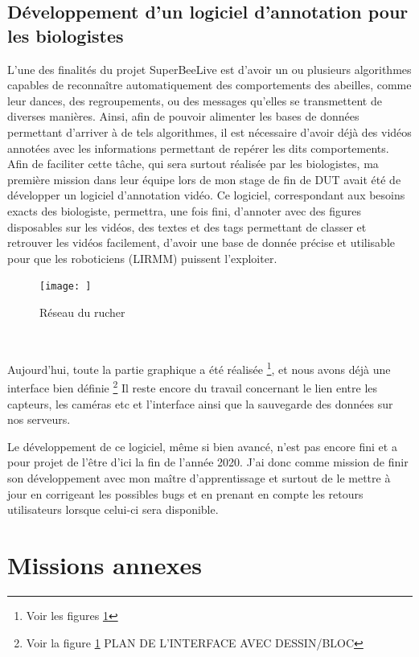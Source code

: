 \documentclass[11pt,french,a4paper]{report}
\begin{document}
{\subsection{Développement d'un logiciel d'annotation pour les biologistes}
L'une des finalités du projet SuperBeeLive est d'avoir un ou plusieurs algorithmes capables de reconnaître automatiquement 
des comportements des abeilles, comme leur dances, des regroupements, ou des messages qu'elles se transmettent de diverses manières.
Ainsi, afin de pouvoir alimenter les bases de données permettant d'arriver à de tels algorithmes, il est nécessaire d'avoir 
déjà des vidéos annotées avec les informations permettant de repérer les dits comportements. 
Afin de faciliter cette tâche, qui sera surtout réalisée par les biologistes, ma première mission dans leur équipe lors de mon 
stage de fin de DUT avait été de développer un logiciel d'annotation vidéo. Ce logiciel, correspondant aux besoins exacts des 
biologiste, permettra, une fois fini, d'annoter avec des figures disposables sur les vidéos, des textes et des tags permettant de
classer et retrouver les vidéos facilement, d'avoir une base de donnée précise et utilisable pour que les roboticiens (LIRMM) puissent
l'exploiter. 

\begin{figure}
    \centering
    \texttt{[image: ]}
    \caption{Réseau du rucher}
    \label{reseau_rucher}
\end{figure} 


Aujourd'hui, toute la partie graphique a été réalisée \footnote{Voir les figures \ref{}}, et nous avons déjà une interface bien 
définie \footnote{Voir la figure \ref{} PLAN DE L'INTERFACE AVEC DESSIN/BLOC}
Il reste encore du travail concernant le lien entre les capteurs, les caméras etc et l'interface ainsi que la sauvegarde
des données sur nos serveurs. 

Le développement de ce logiciel, même si bien avancé, n'est pas encore fini et a pour projet de l'être d'ici la fin de l'année 2020. 
J'ai donc comme mission de finir son développement avec mon maître d'apprentissage et surtout de le mettre à jour en corrigeant les 
possibles bugs et en prenant en compte les retours utilisateurs lorsque celui-ci sera disponible. 


\section{Missions annexes}
}
\end{document}
